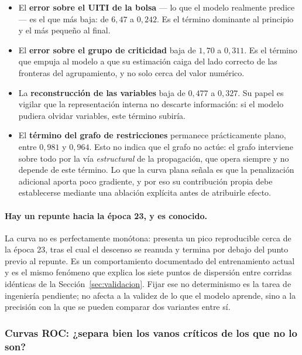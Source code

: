 \documentclass[11pt,a4paper]{article}
\begin{document}
\begin{bloquenuevo}
\begin{itemize}[itemsep=0.2em]
  \item El \textbf{error sobre el UITI de la bolsa} --- lo que el modelo realmente predice ---
        es el que más baja: de $6{,}47$ a $0{,}242$. Es el término dominante al principio y el
        más pequeño al final.
  \item El \textbf{error sobre el grupo de criticidad} baja de $1{,}70$ a $0{,}311$. Es el
        término que empuja al modelo a que su estimación caiga del lado correcto de las
        fronteras del agrupamiento, y no solo cerca del valor numérico.
  \item La \textbf{reconstrucción de las variables} baja de $0{,}477$ a $0{,}327$. Su papel es
        vigilar que la representación interna no descarte información: si el modelo pudiera
        olvidar variables, este término subiría.
  \item El \textbf{término del grafo de restricciones} permanece prácticamente plano, entre
        $0{,}981$ y $0{,}964$. Esto no indica que el grafo no actúe: el grafo interviene sobre
        todo por la vía \emph{estructural} de la propagación, que opera siempre y no depende de
        este término. Lo que la curva plana señala es que la penalización adicional aporta poco
        gradiente, y por eso su contribución propia debe establecerse mediante una ablación
        explícita antes de atribuirle efecto.
\end{itemize}

\paragraph{Hay un repunte hacia la época 23, y es conocido.} La curva no es perfectamente
monótona: presenta un pico reproducible cerca de la época 23, tras el cual el descenso se
reanuda y termina por debajo del punto previo al repunte. Es un comportamiento documentado del
entrenamiento actual y es el mismo fenómeno que explica los siete puntos de dispersión entre
corridas idénticas de la Sección~\ref{sec:validacion}. Fijar ese no determinismo es la tarea de
ingeniería pendiente; no afecta a la validez de lo que el modelo aprende, sino a la precisión
con la que se pueden comparar dos variantes entre sí.
\end{bloquenuevo}

\subsubsection{Curvas ROC: ¿separa bien los vanos críticos de los que no lo son?}
\end{document}
